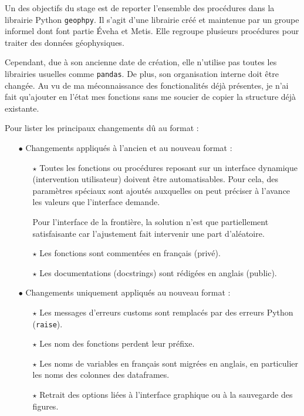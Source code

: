 \documentclass[12pt]{article}
\begin{document}
    Un des objectifs du stage est de reporter l'ensemble des procédures dans la librairie Python \texttt{geophpy}. Il s'agit d'une librairie créé et maintenue par un groupe informel dont font partie Éveha et Metis. Elle regroupe plusieurs procédures pour traiter des données géophysiques.

    Cependant, due à son ancienne date de création, elle n'utilise pas toutes les librairies usuelles comme \texttt{pandas}. De plus, son organisation interne doit être changée. Au vu de ma méconnaissance des fonctionalités déjà présentes, je n'ai fait qu'ajouter en l'état mes fonctions sans me soucier de copier la structure déjà existante.

    Pour lister les principaux changements dû au format :
    \begin{enumerate}
        \item[$\bullet$] Changements appliqués à l'ancien et au nouveau format :

        \begin{enumerate}
            \item[$\star$] Toutes les fonctions ou procédures reposant sur un interface dynamique (intervention utilisateur) doivent être automatisables. Pour cela, des paramètres spéciaux sont ajoutés auxquelles on peut préciser à l'avance les valeurs que l'interface demande.

            Pour l'interface de la frontière, la solution n'est que partiellement satisfaisante car l'ajustement fait intervenir une part d'aléatoire.

            \item[$\star$] Les fonctions sont commentées en français (privé).

            \item[$\star$] Les documentations (docstrings) sont rédigées en anglais (public).
        \end{enumerate}
        
        \item[$\bullet$] Changements uniquement appliqués au nouveau format :

        \begin{enumerate}
            \item[$\star$] Les messages d'erreurs customs sont remplacés par des erreurs Python (\texttt{raise}).

            \item[$\star$] Les nom des fonctions perdent leur préfixe.

            \item[$\star$] Les noms de variables en français sont migrées en anglais, en particulier les noms des colonnes des dataframes.

            \item[$\star$] Retrait des options liées à l'interface graphique ou à la sauvegarde des figures.
        \end{enumerate}
    \end{enumerate}
\end{document}
